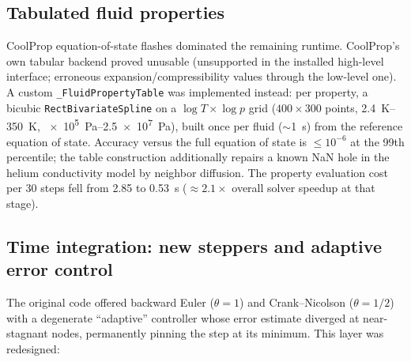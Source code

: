 \documentclass[11pt,a4paper]{article}
\newcommand{\code}[1]{\texttt{#1}}
\begin{document}
\subsection{Tabulated fluid properties}

CoolProp equation-of-state flashes dominated the remaining runtime. CoolProp's own
tabular backend proved unusable (unsupported in the installed high-level interface;
erroneous expansion/compressibility values through the low-level one). A custom
\code{\_FluidPropertyTable} was implemented instead: per property, a bicubic
\code{RectBivariateSpline} on a $\log T \times \log p$ grid
($400 \times 300$ points, \SIrange{2.4}{350}{K}, \SIrange{e5}{2.5e7}{Pa}), built once
per fluid ($\sim$\SI{1}{s}) from the reference equation of state. Accuracy versus the
full equation of state is $\le 10^{-6}$ at the 99th percentile; the table construction
additionally repairs a known NaN hole in the helium conductivity model by neighbor
diffusion. The property evaluation cost per 30 steps fell from 2.85 to \SI{0.53}{s}
($\approx 2.1\times$ overall solver speedup at that stage).

\subsection{Time integration: new steppers and adaptive error control}
\label{sec:timestepping}

The original code offered backward Euler ($\theta=1$) and Crank--Nicolson
($\theta=1/2$) with a degenerate ``adaptive'' controller whose error estimate diverged
at near-stagnant nodes, permanently pinning the step at its minimum. This layer was
redesigned:
\end{document}
